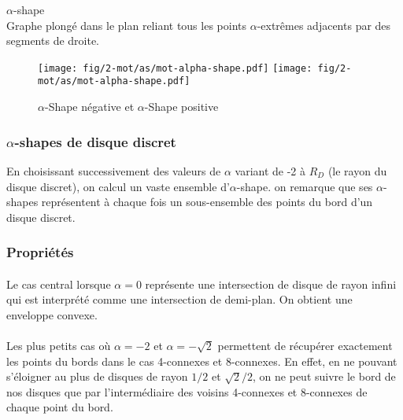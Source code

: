 \begin{Definition}{$\alpha$-shape}\\
\label{def:as}
      Graphe plongé dans le plan reliant tous les points $\alpha$-extrêmes adjacents par des segments de droite.
\end{Definition}

\begin{figure}[h!]
  \centering
  \texttt{[image: fig/2-mot/as/mot-alpha-shape.pdf]}
  \texttt{[image: fig/2-mot/as/mot-alpha-shape.pdf]}
  \caption{$\alpha$-Shape négative et $\alpha$-Shape positive }
\end{figure}


\subsubsection{$\alpha$-shapes de disque discret}

En choisissant successivement des valeurs de $\alpha$ variant de -2 à $R_D$ (le rayon du disque discret), on calcul un vaste ensemble d'$\alpha$-shape. on remarque que ses $\alpha$-shapes représentent à chaque fois un sous-ensemble des points du bord d'un disque discret.


\subsubsection{Propriétés}

\paragraph{}
Le cas central lorsque $\alpha = 0$ représente une intersection de disque de rayon infini qui est interprété comme une intersection de demi-plan. On obtient une enveloppe convexe.

\paragraph{}
Les plus petits cas où $\alpha = -2$ et $\alpha = -\sqrt{2}$ permettent de récupérer exactement les points du bords dans le cas 4-connexes et 8-connexes. En effet, en ne pouvant s'éloigner au plus de disques de rayon $1/2$ et $\sqrt{2}/2$, on ne peut suivre le bord de nos disques que par l'intermédiaire des voisins 4-connexes et 8-connexes de chaque point du bord.

